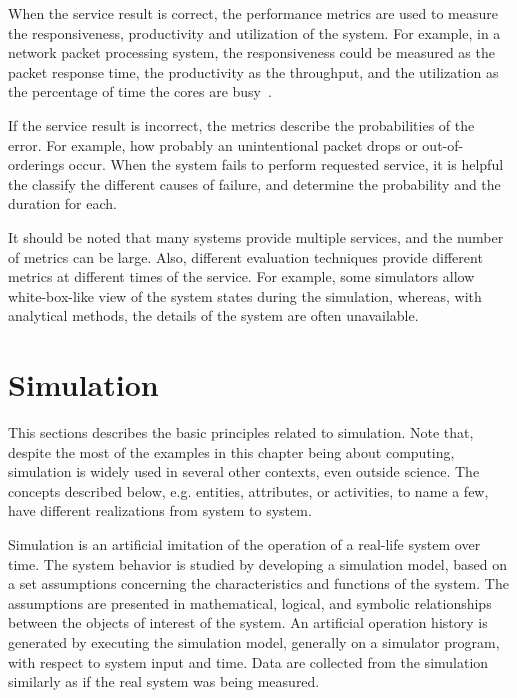 When the service result is correct, the performance metrics are used to measure the responsiveness, productivity and utilization of the system. For example, in a network packet processing system, the responsiveness could be measured as the packet response time, the productivity as the throughput, and the utilization as the percentage of time the cores are busy~\cite{cavium:2010:fundamentals}.~\cite{jain:1991:AOCSPA}

If the service result is incorrect, the metrics describe the probabilities of the error. For example, how probably an unintentional packet drops or out-of-orderings occur. When the system fails to perform requested service, it is helpful the classify the different causes of failure, and determine the probability and the duration for each.~\cite{jain:1991:AOCSPA}

It should be noted that many systems provide multiple services, and the number of metrics can be large. Also, different evaluation techniques provide different metrics at different times of the service. For example, some simulators allow white-box-like view of the system states during the simulation, whereas, with analytical methods, the details of the system are often unavailable.~\cite{jain:1991:AOCSPA}~\cite{TODO: find reference for the white-box black-box stuff}

\section{Simulation}
This sections describes the basic principles related to simulation. Note that, despite the most of the examples in this chapter being about computing, simulation is widely used in several other contexts, even outside science. The concepts described below, e.g. entities, attributes, or activities, to name a few, have different realizations from system to system.

Simulation is an artificial imitation of the operation of a real-life system over time. The system behavior is studied by developing a simulation model, based on a set assumptions concerning the characteristics and functions of the system. The assumptions are presented in mathematical, logical, and symbolic relationships between the objects of interest of the system. An artificial operation history is generated by executing the simulation model, generally on a simulator program, with respect to system input and time. Data are collected from the simulation similarly as if the real system was being measured.

